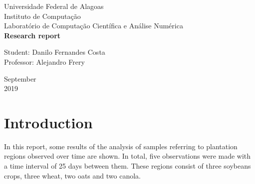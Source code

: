 \documentclass[12pt]{article}
\begin{document}

\onehalfspacing

\begin{titlepage}
\begin{center}

\Huge{Universidade Federal de Alagoas}\\
\large{Instituto de Computação}\\ 
\large{Laboratório de Computação Científica e Análise Numérica}\\ 
\vspace{220pt}
\textbf{\LARGE{Research report}}\\
\vspace{3,5cm}
\end{center}

\begin{flushleft}
\begin{tabbing}
Student: Danilo Fernandes Costa\\
Professor: Alejandro Frery\\
\end{tabbing}
\end{flushleft}
\vspace{1cm}

\begin{center}
\vspace{\fill}
September\\
2019
\end{center}
\end{titlepage}

\section{Introduction}

In this report, some results of the analysis of samples referring to plantation regions observed over time are shown. In total, five observations were made with a time interval of 25 days between them.
These regions consist of three soybeans crops, three wheat, two oats and two canola.
\end{document}
